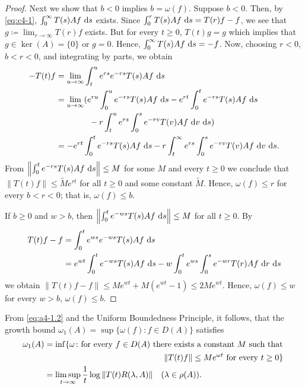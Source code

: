 \begin{proof}
Next we show that $b < 0$ implies $b = \omega(f)$. 
Suppose $b < 0$. 
Then, by \eqref{eq:c4-1}, $\int_{0}^{\infty} T(s)Af \,\mathop{}\!\mathrm{d}{s}$ exists. 
Since $\int_{0}^{r} T(s)Af \,\mathop{}\!\mathrm{d}{s} = T(r)f - f$, we see that $g \coloneqq\lim_{r \to \infty} T(r)f$ exists. 
But for every $t \geq 0$, $T(t)g = g$ which implies that $g \in \ker(A) = \{0\}$ or $g = 0$. 
Hence, $\int_{0}^{\infty} T(s)Af \,\mathop{}\!\mathrm{d}{s} = -f$.
Now, choosing $r < 0$, $b < r < 0$, and integrating by parts, we obtain
\begin{align*}
-T(t)f &= \lim_{u \to \infty} \int_{t}^{u} e^{r s} e^{-r s} T(s)Af \,\ds\\
&= \lim_{u \to \infty} ( e^{ru}\int_0^ue^{-rs} T(s)Af \,\ds - e^{rt}\int_0^te^{-rs} T(s)Af \,\ds\\ 
& \qquad \qquad -r\int_t^u e^{rs}\int_0^s e^{-rv} T(v)Af\,\diff{v} \,\ds
) \\
&= - e^{rt}\int_0^te^{-rs} T(s)Af \,\ds -r\int_t^\infty e^{rs}\int_0^s e^{-rv} T(v)Af\,\diff{v} \,\ds.
\end{align*}
From $\left\|\int_{0}^{t} e^{-r s} T(s)Af \,\mathop{}\!\mathrm{d}{s}\right\| \leq M$ for some $M$ and every $t \geq 0$ we conclude that $\|T(t)f\| \leq \tilde{M}e^{rt}$ for all $t \geq 0$ and some constant $\tilde{M}$.
Hence, $\omega(f) \leq r$ for every $b < r < 0$; that is, $\omega(f) \leq b$.



If $b \geq 0$ and $w > b$, then $\left\|\int_{0}^{t} e^{-w s} T(s)Af\,\mathop{}\!\mathrm{d}{s}\right\| \leq M$ for all $t \geq 0$. 
By 
\begin{align*}
T(t)f - f &= \int_{0}^{t} e^{w s} e^{-w s} T(s)Af \,\mathop{}\!\mathrm{d}{s}\\
&= e^{wt}\int_0^t e^{-ws} T(s)Af\,\mathop{}\!\mathrm{d}{s} - w\int_0^te^{ws}\int_0^s e^{-wr} T(r)Af\, \mathop{}\!\mathrm{d}{r}\,\mathop{}\!\mathrm{d}{s}
\end{align*}
we obtain $\|T(t)f-f\| \leq Me^{w t} + M(e^{w t} - 1)
\le 2Me^{wt}$. 
Hence, $\omega(f)\le w$ for every $w > b$, \ie $\omega(f) \leq b$.
\end{proof}



From \eqref{eq:a4-1.2} and the Uniform Boundedness Principle, it follows, that the growth bound $\omega_{1}(A) = \sup\{\omega(f) \colon f \in D(A)\}$ satisfies
\begin{align}\label{eq:a4-1.3}
\omega_1(A) &= \inf\{\omega \colon \text{for every } f \in D(A) \text{ there exists a constant } M \text{ such that }\\
& \hskip 2 true in \|T(t)f\| \leq Me^{\omega t} \text{ for every } t \geq 0\} \notag\\
&=
\limsup_{t \to \infty} \frac{1}{t} \log\|T(t)R(\lambda,A)\| \quad (\lambda \in \rho(A)). 
\notag
\end{align}

